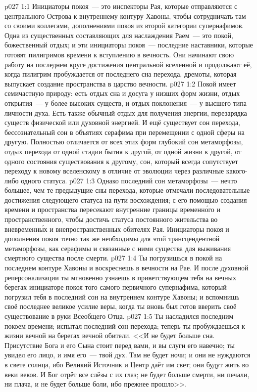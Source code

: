 \vs p027 1:1 Инициаторы покоя~--- это инспекторы Рая, которые отправляются с центрального Острова к внутреннему контуру Хавоны, чтобы сотрудничать там со своими коллегами, дополнениями покоя из второй категории супернафимов. Одна из существенных составляющих для наслаждения Раем~--- это покой, божественный отдых; и эти инициаторы покоя~--- последние наставники, которые готовят пилигримов времени к вступлению в вечность. Они начинают свою работу на последнем круге достижения центральной вселенной и продолжают её, когда пилигрим пробуждается от последнего сна перехода, дремоты, которая выпускает создание пространства в царство вечности.
\vs p027 1:2 \pc Покой имеет семичастную природу: есть отдых сна и досуга у низших форм жизни, отдых открытия~--- у более высоких существ, и отдых поклонения~--- у высшего типа личности духа. Есть также обычный отдых для получения энергии, перезарядка существ физической или духовной энергией. И ещё существует сон перехода, бессознательный сон в объятиях серафима при перемещении с одной сферы на другую. Полностью отличается от всех этих форм глубокий сон метаморфозы, отдых перехода от одной стадии бытия к другой, от одной жизни к другой, от одного состояния существования к другому, сон, который всегда сопутствует переходу к новому вселенскому  в отличие от эволюции через различные  какого\hyp{}либо одного статуса.
\vs p027 1:3 Однако последний сон метаморфозы~--- нечто большее, чем те предыдущие сны перехода, которые отмечали последовательные достижения следующего статуса на пути восхождения; с его помощью создания времени и пространства пересекают внутренние границы временн\'ого и пространственного, чтобы достичь статуса постоянного жительства во вневременн\'ых и внепространственных обителях Рая. Инициаторы покоя и дополнения покоя точно так же необходимы для этой трансцендентной метаморфозы, как серафимы и связанные с ними существа для выживания смертного существа после смерти.
\vs p027 1:4 \pc Ты погрузишься в покой на последнем контуре Хавоны и воскреснешь в вечности на Рае. И после духовной реперсонализации ты мгновенно узнаешь в приветствующем тебя на вечных берегах инициаторе покоя того самого первичного супернафима, который погрузил тебя в последний сон на внутреннем контуре Хавоны; и вспомнишь своё последнее великое усилие веры, когда ты вновь был готов вверить своё существование в руки Всеобщего Отца.
\vs p027 1:5 Ты насладился последним покоем времени; испытал последний сон перехода; теперь ты пробуждаешься к жизни вечной на берегах вечной обители. <<И не будет больше сна. Присутствие Бога и его Сына стоит перед вами, и вы слуги его навечно; ты увидел его лицо, и имя его~--- твой дух. Там не будет ночи; и они не нуждаются в свете солнца, ибо Великий Источник и Центр даёт им свет; они будут жить во веки веков. И Бог отрёт все слёзы с их глаз; не будет больше смерти, ни печали, ни плача, и не будет больше боли, ибо прежнее прошло>>.
